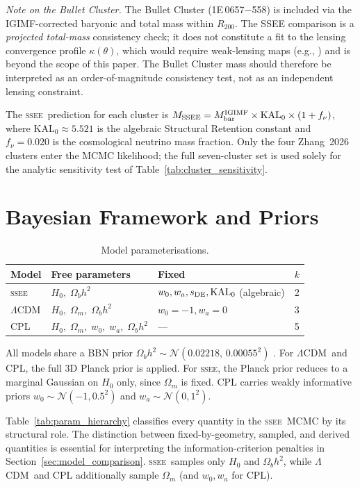 \documentclass[12pt,a4paper]{article}
\newcommand{\SSEE}{\ifmmode\mathrm{SSEE}\else\textsc{ssee}\fi}
\newcommand{\LCDM}{\ifmmode\Lambda\mathrm{CDM}\else$\Lambda$CDM\fi}
\newcommand{\KALz}{\mathrm{KAL}_0}
\newcommand{\wz}{w_0}
\newcommand{\wa}{w_a}
\begin{document}
\textit{Note on the Bullet Cluster.}
The Bullet Cluster (1E\,0657$-$558) is included via the
\citet{Zhang2026} IGIMF-corrected baryonic and total mass within $R_{200}$.
The SSEE comparison is a \emph{projected total-mass} consistency check;
it does not constitute a fit to the lensing convergence profile $\kappa(\theta)$,
which would require weak-lensing maps (e.g., \citealt{Clowe2006}) and
is beyond the scope of this paper.
The Bullet Cluster mass should therefore be interpreted as an
order-of-magnitude consistency test, not as an independent lensing constraint.

The \SSEE\ prediction for each cluster is
$M_{\rm SSEE}=M_{\rm bar}^{\rm IGIMF}\times\KALz\times(1+f_\nu)$,
where $\KALz\approx5.521$ is the algebraic Structural Retention constant
and $f_\nu=0.020$ is the cosmological neutrino mass fraction.
Only the four Zhang~2026 clusters enter the MCMC likelihood;
the full seven-cluster set is used solely for the analytic
sensitivity test of Table~\ref{tab:cluster_sensitivity}.

\section{Bayesian Framework and Priors}
\label{sec:bayes}

\begin{table}[H]
\centering
\caption{Model parameterisations.}
\label{tab:models}
\begin{tabular}{llll}
\toprule
Model & Free parameters & Fixed & $k$ \\
\midrule
\SSEE & $H_0,\;\Omega_b h^2$ & $\wz,\wa,s_{\rm DE},\KALz$ (algebraic) & 2 \\
\LCDM      & $H_0,\;\Omega_m,\;\Omega_b h^2$ & $\wz=-1,\wa=0$ & 3 \\
CPL        & $H_0,\;\Omega_m,\;\wz,\;\wa,\;\Omega_b h^2$ & --- & 5 \\
\bottomrule
\end{tabular}
\end{table}

All models share a BBN prior $\Omega_b h^2\sim\mathcal{N}(0.02218,\,0.00055^2)$ \citep{Cooke2018}.
For \LCDM\ and CPL, the full 3D Planck prior is applied. For \SSEE,
the Planck prior reduces to a marginal Gaussian on $H_0$ only, since
$\Omega_m$ is fixed. CPL carries weakly informative priors
$\wz\sim\mathcal{N}(-1,0.5^2)$ and $\wa\sim\mathcal{N}(0,1^2)$.

Table~\ref{tab:param_hierarchy} classifies every quantity in the \SSEE\
MCMC by its structural role. The distinction between fixed-by-geometry,
sampled, and derived quantities is essential for interpreting the
information-criterion penalties in Section~\ref{sec:model_comparison}.
\SSEE\ samples only $H_0$ and $\Omega_b h^2$, while \LCDM\ and CPL
additionally sample $\Omega_m$ (and $\wz,\wa$ for CPL).
\end{document}
